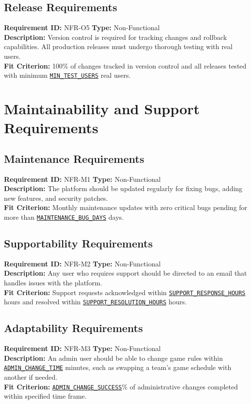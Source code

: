 \documentclass[12pt, titlepage]{article}
\begin{document}
\subsection{Release Requirements}
\textbf{Requirement ID:} NFR-O5 \quad \textbf{Type:} Non-Functional \\
\textbf{Description:} Version control is required for tracking changes and rollback capabilities. All production releases must undergo thorough testing with real users.\\
\textbf{Fit Criterion:} 100\% of changes tracked in version control and all releases tested with minimum \hyperref[MIN_TEST_USERS]{\texttt{MIN\_TEST\_USERS}} real users.

\section{Maintainability and Support Requirements}
\subsection{Maintenance Requirements}
\textbf{Requirement ID:} NFR-M1 \quad \textbf{Type:} Non-Functional \\
\textbf{Description:} The platform should be updated regularly for fixing bugs, adding new features, and security patches.\\
\textbf{Fit Criterion:} Monthly maintenance updates with zero critical bugs pending for more than \hyperref[MAINTENANCE_BUG_DAYS]{\texttt{MAINTENANCE\_BUG\_DAYS}} days.

\subsection{Supportability Requirements}
\textbf{Requirement ID:} NFR-M2 \quad \textbf{Type:} Non-Functional \\
\textbf{Description:} Any user who requires support should be directed to an email that handles issues with the platform.\\
\textbf{Fit Criterion:} Support requests acknowledged within \hyperref[SUPPORT_RESPONSE_HOURS]{\texttt{SUPPORT\_RESPONSE\_HOURS}} hours and resolved within \hyperref[SUPPORT_RESOLUTION_HOURS]{\texttt{SUPPORT\_RESOLUTION\_HOURS}} hours.

\subsection{Adaptability Requirements}
\textbf{Requirement ID:} NFR-M3 \quad \textbf{Type:} Non-Functional \\
\textbf{Description:} An admin user should be able to change game rules within \hyperref[ADMIN_CHANGE_TIME]{\texttt{ADMIN\_CHANGE\_TIME}} minutes, such as swapping a team's game schedule with another if needed.\\
\textbf{Fit Criterion:} \hyperref[ADMIN_CHANGE_SUCCESS]{\texttt{ADMIN\_CHANGE\_SUCCESS}}\% of administrative changes completed within specified time frame.
\end{document}
